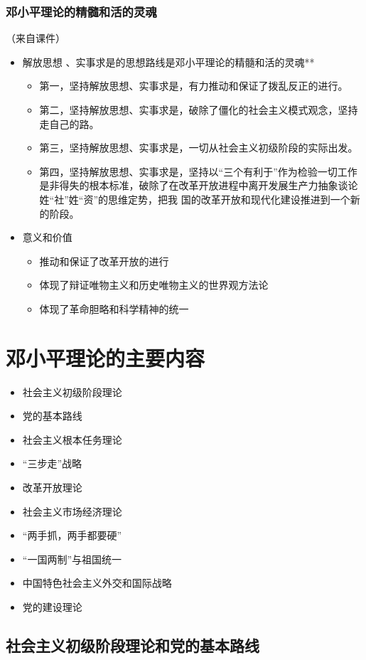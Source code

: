 \documentclass[12pt,openany]{ctexbook}
\begin{document}
\subsubsection{邓小平理论的精髓和活的灵魂}
（来自课件）
\begin{itemize}
  \item 解放思想 、实事求是的思想路线是邓小平理论的精髓和活的灵魂**
\begin{itemize}
  \item 第一，坚持解放思想、实事求是，有力推动和保证了拨乱反正的进行。
  \item 第二，坚持解放思想、实事求是，破除了僵化的社会主义模式观念，坚持走自己的路。
  \item 第三，坚持解放思想、实事求是，一切从社会主义初级阶段的实际出发。
  \item 第四，坚持解放思想、实事求是，坚持以“三个有利于”作为检验一切工作是非得失的根本标准，破除了在改革开放进程中离开发展生产力抽象谈论姓“社”姓“资”的思维定势，把我 国的改革开放和现代化建设推进到一个新的阶段。
\end{itemize}
  \item 意义和价值
\begin{itemize}
  \item 推动和保证了改革开放的进行
  \item 体现了辩证唯物主义和历史唯物主义的世界观方法论
  \item 体现了革命胆略和科学精神的统一
\end{itemize}
\end{itemize}
\section{邓小平理论的主要内容}
\begin{itemize}
  \item 社会主义初级阶段理论
  \item 党的基本路线
  \item 社会主义根本任务理论
  \item “三步走”战略
  \item 改革开放理论
  \item 社会主义市场经济理论
  \item “两手抓，两手都要硬”
  \item “一国两制”与祖国统一
  \item 中国特色社会主义外交和国际战略
  \item 党的建设理论
\end{itemize}
\subsection{社会主义初级阶段理论和党的基本路线}
\end{document}
